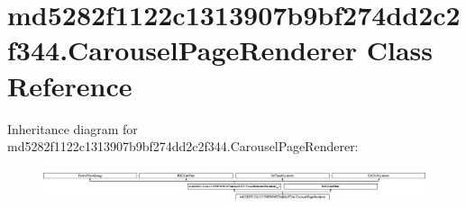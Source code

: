 \hypertarget{classmd5282f1122c1313907b9bf274dd2c2f344_1_1CarouselPageRenderer}{}\section{md5282f1122c1313907b9bf274dd2c2f344.\+Carousel\+Page\+Renderer Class Reference}
\label{classmd5282f1122c1313907b9bf274dd2c2f344_1_1CarouselPageRenderer}
Inheritance diagram for md5282f1122c1313907b9bf274dd2c2f344.\+Carousel\+Page\+Renderer\+:\begin{figure}[H]
\begin{center}
\leavevmode
\includegraphics[height=1.029412cm]{classmd5282f1122c1313907b9bf274dd2c2f344_1_1CarouselPageRenderer}
\end{center}
\end{figure}
